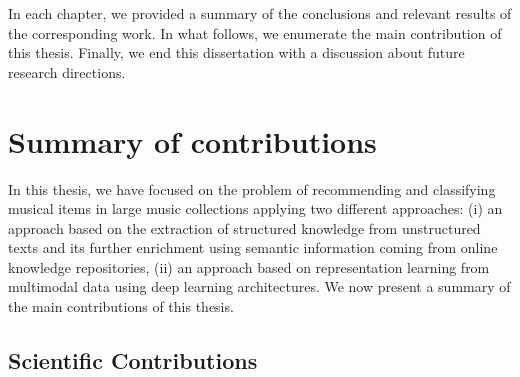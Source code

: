 In each chapter, we provided a summary of the conclusions and relevant results of the corresponding work. In what follows, we enumerate the main contribution of this thesis. Finally, we end this dissertation with a discussion about future research directions.

\section{Summary of contributions}
\label{sec:conclusion:summary}

In this thesis, we have focused on the problem of recommending and classifying musical items in large music collections applying two different approaches: (i) an approach based on the extraction of structured knowledge from unstructured texts and its further enrichment using semantic information coming from online knowledge repositories, (ii) an approach based on representation learning from multimodal data using deep learning architectures. We now present a summary of the main contributions of this thesis.

\subsection{Scientific Contributions}

